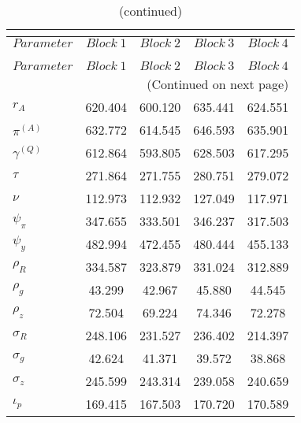  
\begin{center}
\begin{longtable}{lcccc} 
\caption{MCMC Inefficiency factors per block}\\
 \label{Table:MCMC_inefficiency_factors}\\
\toprule 
$Parameter         $	 & 	 $     Block~1$	 & 	 $     Block~2$	 & 	 $     Block~3$	 & 	 $     Block~4$\\
\midrule \endfirsthead 
\caption{(continued)}\\
 \toprule \\ 
$Parameter         $	 & 	 $     Block~1$	 & 	 $     Block~2$	 & 	 $     Block~3$	 & 	 $     Block~4$\\
\midrule \endhead 
\midrule \multicolumn{5}{r}{(Continued on next page)} \\ \bottomrule \endfoot 
\bottomrule \endlastfoot 
$ {r_{A}}          $	 & 	     620.404	 & 	     600.120	 & 	     635.441	 & 	     624.551 \\ 
$ {\pi^{(A)}}      $	 & 	     632.772	 & 	     614.545	 & 	     646.593	 & 	     635.901 \\ 
$ {\gamma^{(Q)}}   $	 & 	     612.864	 & 	     593.805	 & 	     628.503	 & 	     617.295 \\ 
$ {\tau}           $	 & 	     271.864	 & 	     271.755	 & 	     280.751	 & 	     279.072 \\ 
$ {\nu}            $	 & 	     112.973	 & 	     112.932	 & 	     127.049	 & 	     117.971 \\ 
$ {\psi_\pi}       $	 & 	     347.655	 & 	     333.501	 & 	     346.237	 & 	     317.503 \\ 
$ {\psi_y}         $	 & 	     482.994	 & 	     472.455	 & 	     480.444	 & 	     455.133 \\ 
$ {\rho_R}         $	 & 	     334.587	 & 	     323.879	 & 	     331.024	 & 	     312.889 \\ 
$ {\rho_{g}}       $	 & 	      43.299	 & 	      42.967	 & 	      45.880	 & 	      44.545 \\ 
$ {\rho_z}         $	 & 	      72.504	 & 	      69.224	 & 	      74.346	 & 	      72.278 \\ 
$ {\sigma_R}       $	 & 	     248.106	 & 	     231.527	 & 	     236.402	 & 	     214.397 \\ 
$ {\sigma_{g}}     $	 & 	      42.624	 & 	      41.371	 & 	      39.572	 & 	      38.868 \\ 
$ {\sigma_z}       $	 & 	     245.599	 & 	     243.314	 & 	     239.058	 & 	     240.659 \\ 
$ {\iota_p}        $	 & 	     169.415	 & 	     167.503	 & 	     170.720	 & 	     170.589 \\ 
\end{longtable}
 \end{center}
